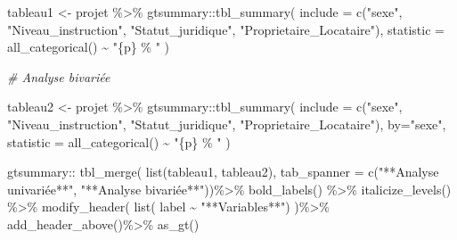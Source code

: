 \documentclass[
  14pt,
]{article}
\newenvironment{Shaded}{\begin{snugshade}}{\end{snugshade}}
\newcommand{\AttributeTok}[1]{\textcolor[rgb]{0.77,0.63,0.00}{#1}}
\newcommand{\CommentTok}[1]{\textcolor[rgb]{0.56,0.35,0.01}{\textit{#1}}}
\newcommand{\FunctionTok}[1]{\textcolor[rgb]{0.00,0.00,0.00}{#1}}
\newcommand{\NormalTok}[1]{#1}
\newcommand{\OtherTok}[1]{\textcolor[rgb]{0.56,0.35,0.01}{#1}}
\newcommand{\SpecialCharTok}[1]{\textcolor[rgb]{0.00,0.00,0.00}{#1}}
\newcommand{\StringTok}[1]{\textcolor[rgb]{0.31,0.60,0.02}{#1}}
\begin{document}
\begin{Shaded}
\begin{Highlighting}[]
\NormalTok{tableau1 }\OtherTok{\textless{}{-}}\NormalTok{ projet }\SpecialCharTok{\%\textgreater{}\%} 
\NormalTok{  gtsummary}\SpecialCharTok{::}\FunctionTok{tbl\_summary}\NormalTok{(}
    \AttributeTok{include =} \FunctionTok{c}\NormalTok{(}\StringTok{"sexe"}\NormalTok{,}
                \StringTok{"Niveau\_instruction"}\NormalTok{,}
                \StringTok{"Statut\_juridique"}\NormalTok{,}
                \StringTok{"Proprietaire\_Locataire"}\NormalTok{),}
    \AttributeTok{statistic =} \FunctionTok{all\_categorical}\NormalTok{() }\SpecialCharTok{\textasciitilde{}} \StringTok{"\{p\} \% "}
\NormalTok{  ) }

\CommentTok{\# Analyse bivariée}

\NormalTok{tableau2 }\OtherTok{\textless{}{-}}\NormalTok{ projet }\SpecialCharTok{\%\textgreater{}\%} 
\NormalTok{  gtsummary}\SpecialCharTok{::}\FunctionTok{tbl\_summary}\NormalTok{(}
  \AttributeTok{include =} \FunctionTok{c}\NormalTok{(}\StringTok{"sexe"}\NormalTok{,}
              \StringTok{"Niveau\_instruction"}\NormalTok{,}
              \StringTok{"Statut\_juridique"}\NormalTok{,}
              \StringTok{"Proprietaire\_Locataire"}\NormalTok{),}
  \AttributeTok{by=}\StringTok{"sexe"}\NormalTok{,}
  \AttributeTok{statistic =} \FunctionTok{all\_categorical}\NormalTok{() }\SpecialCharTok{\textasciitilde{}} \StringTok{"\{p\} \% "}
\NormalTok{)}

\NormalTok{gtsummary}\SpecialCharTok{::} \FunctionTok{tbl\_merge}\NormalTok{(}
  \FunctionTok{list}\NormalTok{(tableau1, }
\NormalTok{       tableau2),}
  \AttributeTok{tab\_spanner =} \FunctionTok{c}\NormalTok{(}\StringTok{"**Analyse univariée**"}\NormalTok{,}
                  \StringTok{"**Analyse bivariée**"}\NormalTok{))}\SpecialCharTok{\%\textgreater{}\%}
  \FunctionTok{bold\_labels}\NormalTok{() }\SpecialCharTok{\%\textgreater{}\%}
  \FunctionTok{italicize\_levels}\NormalTok{() }\SpecialCharTok{\%\textgreater{}\%}  
  \FunctionTok{modify\_header}\NormalTok{(}
    \FunctionTok{list}\NormalTok{(}
\NormalTok{      label }\SpecialCharTok{\textasciitilde{}} \StringTok{"**Variables**"}\NormalTok{)}
\NormalTok{  )}\SpecialCharTok{\%\textgreater{}\%}
  \FunctionTok{add\_header\_above}\NormalTok{()}\SpecialCharTok{\%\textgreater{}\%}
 \FunctionTok{as\_gt}\NormalTok{() }
\end{Highlighting}
\end{Shaded}
\end{document}

